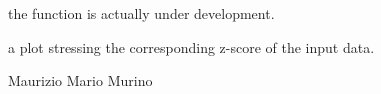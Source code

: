 \documentclass[a4paper]{book}
\begin{document}
%
\begin{Details}\relax
the function is actually under development.
\end{Details}
%
\begin{Value}
a plot stressing the corresponding z-score of the input data.
\end{Value}
%
\begin{Author}\relax
Maurizio Mario Murino
\end{Author}
%
\begin{SeeAlso}\relax
{}
\end{SeeAlso}
\printindex{}
\end{document}
